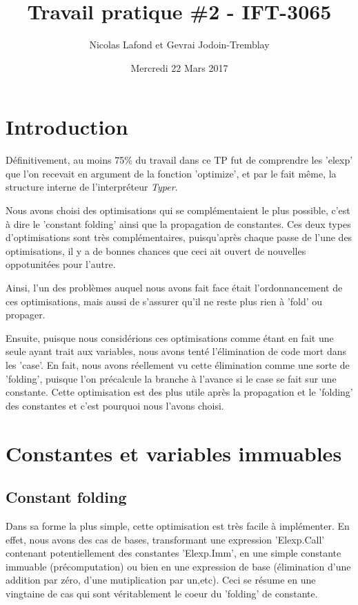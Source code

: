\documentclass{article}
\begin{document}
\title{Travail pratique \#2 - IFT-3065}
\author{Nicolas Lafond et Gevrai Jodoin-Tremblay}
\date{Mercredi 22 Mars 2017}
\maketitle

\section{Introduction}

Définitivement, au moins 75\% du travail dans ce TP fut de comprendre les 'elexp' que l'on recevait en argument de la fonction 'optimize', et par le fait même, la structure interne de l'interpréteur \emph{Typer}.

Nous avons choisi des optimisations qui se complémentaient le plus possible, c'est à dire le 'constant folding' ainsi que la propagation de constantes. Ces deux types d'optimisations sont très complémentaires, puisqu'après chaque passe de l'une des optimisations, il y a de bonnes chances que ceci ait ouvert de nouvelles oppotunitées pour l'autre.

Ainsi, l'un des problèmes auquel nous avons fait face était l'ordonnancement de ces optimisations, mais aussi de s'assurer qu'il ne reste plus rien à 'fold' ou propager.

Ensuite, puisque nous considérions ces optimisations comme étant en fait une seule ayant trait aux variables, nous avons tenté l'élimination de code mort dans les 'case'. En fait, nous avons réellement vu cette élimination comme une sorte de 'folding', puisque l'on précalcule la branche à l'avance si le case se fait sur une constante. Cette optimisation est des plus utile après la propagation et le 'folding' des constantes et c'est pourquoi nous l'avons choisi.

\section{Constantes et variables immuables}
\subsection{Constant folding}

Dans sa forme la plus simple, cette optimisation est très facile à implémenter. En effet, nous avons des cas de bases, transformant une expression 'Elexp.Call' contenant potentiellement des constantes 'Elexp.Imm', en une simple constante immuable (précomputation) ou bien en une expression de base (élimination d'une addition par zéro, d'une mutiplication par un,etc). Ceci se résume en une vingtaine de cas qui sont véritablement le coeur du 'folding' de constante.
\end{document}
